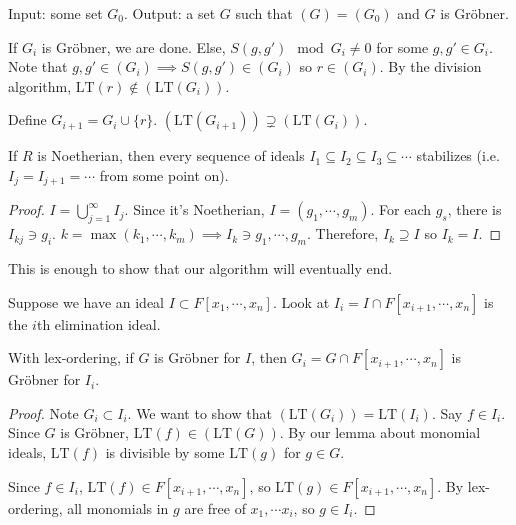 \documentclass[a4paper,twoside,master.tex]{subfiles}
\begin{document}
Input: some set $ G_0 $. Output: a set $ G $ such that $ (G) = (G_0) $ and $ G $ is Gr\"obner.

If $ G_i $ is Gr\"obner, we are done. Else, $ S(g,g') \mod G_i \neq 0 $ for some $ g,g' \in G_i $. Note that $ g, g' \in (G_i) \implies S(g, g') \in (G_i) $ so $ r \in (G_i) $. By the division algorithm, $ \text{LT}(r) \notin (\text{LT}(G_i)) $.

Define $ G_{i+1} = G_i \cup \{r\} $. $ (\text{LT}(G_{i+1})) \supsetneq (\text{LT}(G_i)) $.

\begin{claim}
    If $ R $ is Noetherian, then every sequence of ideals $ I_1 \subseteq I_2 \subseteq I_3 \subseteq \cdots $ stabilizes (i.e. $ I_j = I_{j+1} = \cdots $ from some point on).
\end{claim}
\begin{proof}
    $ I = \bigcup_{j=1}^{\infty} I_j $. Since it's Noetherian, $ I = (g_1, \cdots, g_m) $. For each $ g_s $, there is $ I_{kj} \ni g_i $. $ k = \max(k_1,\cdots, k_m) \implies I_k \ni g_1,\cdots, g_m $. Therefore, $ I_k \supseteq I $ so $ I_k = I $. 
\end{proof}
This is enough to show that our algorithm will eventually end.

Suppose we have an ideal $ I \subset F[x_1,\cdots,x_n] $. Look at $ I_i = I \cap F[x_{i+1}, \cdots, x_n] $ is the $ i $th elimination ideal.
\begin{claim}
    With lex-ordering, if $ G $ is Gr\"obner for $ I $, then $ G_i = G\cap F[x_{i+1}, \cdots, x_n] $ is Gr\"obner for $ I_i $.
\end{claim}
\begin{proof}
    Note $ G_i \subset I_i $. We want to show that $ (\text{LT}(G_i)) = \text{LT}(I_i) $. Say $ f \in I_i $. Since $ G $ is Gr\"obner, $ \text{LT}(f) \in (\text{LT}(G)) $. By our lemma about monomial ideals, $ \text{LT}(f) $ is divisible by some $ \text{LT}(g) $ for $ g \in G $.

    Since $ f \in I_i $, $ \text{LT}(f) \in F[x_{i+1}, \cdots, x_n] $, so $ \text{LT}(g) \in F[x_{i+1}, \cdots, x_n] $. By lex-ordering, all monomials in $ g $ are free of $ x_1, \cdots x_i $, so $ g \in I_i $.
\end{proof}
\end{document}
